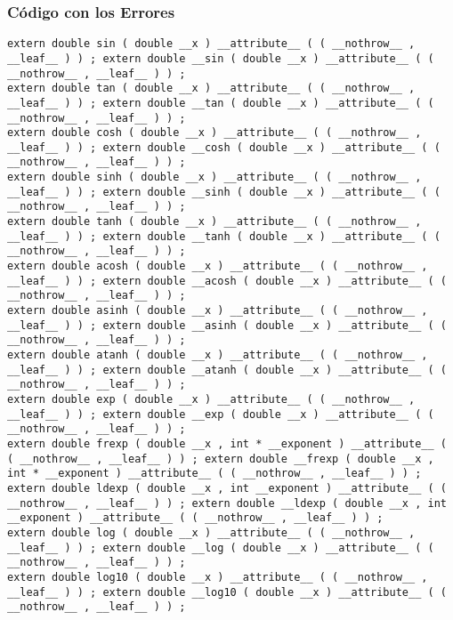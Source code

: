 \documentclass{beamer}
\begin{document}
\begin{frame}[fragile]
\frametitle{C\'odigo con los Errores}
\begin{verbatim}
extern double sin ( double __x ) __attribute__ ( ( __nothrow__ , __leaf__ ) ) ; extern double __sin ( double __x ) __attribute__ ( ( __nothrow__ , __leaf__ ) ) ; 
extern double tan ( double __x ) __attribute__ ( ( __nothrow__ , __leaf__ ) ) ; extern double __tan ( double __x ) __attribute__ ( ( __nothrow__ , __leaf__ ) ) ; 
extern double cosh ( double __x ) __attribute__ ( ( __nothrow__ , __leaf__ ) ) ; extern double __cosh ( double __x ) __attribute__ ( ( __nothrow__ , __leaf__ ) ) ; 
extern double sinh ( double __x ) __attribute__ ( ( __nothrow__ , __leaf__ ) ) ; extern double __sinh ( double __x ) __attribute__ ( ( __nothrow__ , __leaf__ ) ) ; 
extern double tanh ( double __x ) __attribute__ ( ( __nothrow__ , __leaf__ ) ) ; extern double __tanh ( double __x ) __attribute__ ( ( __nothrow__ , __leaf__ ) ) ; 
extern double acosh ( double __x ) __attribute__ ( ( __nothrow__ , __leaf__ ) ) ; extern double __acosh ( double __x ) __attribute__ ( ( __nothrow__ , __leaf__ ) ) ; 
extern double asinh ( double __x ) __attribute__ ( ( __nothrow__ , __leaf__ ) ) ; extern double __asinh ( double __x ) __attribute__ ( ( __nothrow__ , __leaf__ ) ) ; 
extern double atanh ( double __x ) __attribute__ ( ( __nothrow__ , __leaf__ ) ) ; extern double __atanh ( double __x ) __attribute__ ( ( __nothrow__ , __leaf__ ) ) ; 
extern double exp ( double __x ) __attribute__ ( ( __nothrow__ , __leaf__ ) ) ; extern double __exp ( double __x ) __attribute__ ( ( __nothrow__ , __leaf__ ) ) ; 
extern double frexp ( double __x , int * __exponent ) __attribute__ ( ( __nothrow__ , __leaf__ ) ) ; extern double __frexp ( double __x , int * __exponent ) __attribute__ ( ( __nothrow__ , __leaf__ ) ) ; 
extern double ldexp ( double __x , int __exponent ) __attribute__ ( ( __nothrow__ , __leaf__ ) ) ; extern double __ldexp ( double __x , int __exponent ) __attribute__ ( ( __nothrow__ , __leaf__ ) ) ; 
extern double log ( double __x ) __attribute__ ( ( __nothrow__ , __leaf__ ) ) ; extern double __log ( double __x ) __attribute__ ( ( __nothrow__ , __leaf__ ) ) ; 
extern double log10 ( double __x ) __attribute__ ( ( __nothrow__ , __leaf__ ) ) ; extern double __log10 ( double __x ) __attribute__ ( ( __nothrow__ , __leaf__ ) ) ; 
\end{verbatim}
\end{frame}
\end{document}
